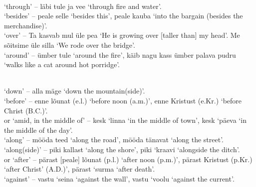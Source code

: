 \newLesson %

\Grammar %


\newSection {} \\

 `through' -- läbi tule ja vee `through fire and water'. \\

 `besides' -- peale selle `besides this', peale kauba `into the bargain (besides the merchandise)'.\\

 `over' -- Ta kasvab mul üle pea `He is growing over [taller than] my head'. Me sõitsime üle silla `We rode over the bridge'. \\

 `around' -- ümber tule `around the fire', käib nagu kass ümber palava pudru `walks like a cat around hot porridge'.

\newSection {} \\

 `down' -- alla mäge `down the mountain(side)'. \\

 `before' -- enne lõunat (e.l.) `before noon (a.m.)', enne Kristust (e.Kr.) `before Christ (B.C.)'. \\

 or  `amid, in the middle of' -- kesk `linna `in the middle of town', kesk `päeva `in the middle of the day'. \\

 `along' -- mööda teed `along the road', mööda tänavat `along the street'. \\

 `along(side)' -- piki kallast `along the shore', piki `kraavi `alongside the ditch'. \\

 or  `after' -- pärast [peale] lõunat (p.l.) `after noon (p.m.)', pärast Kristust (p.Kr.) `after Christ' (A.D.)', pärast `surma `after death'. \\

 `against' -- vastu `seina `against the wall', vastu `voolu `against the current'.

